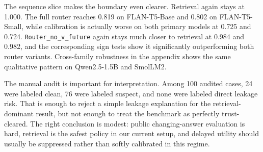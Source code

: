 The sequence slice makes the boundary even clearer. Retrieval again stays at 1.000. The full router reaches 0.819 on FLAN-T5-Base and 0.802 on FLAN-T5-Small, while calibration is actually worse on both primary models at 0.725 and 0.724. \texttt{Router\_no\_v\_future} again stays much closer to retrieval at 0.984 and 0.982, and the corresponding sign tests show it significantly outperforming both router variants. Cross-family robustness in the appendix shows the same qualitative pattern on Qwen2.5-1.5B and SmolLM2.

\begin{table}[h]
\centering
\small

\caption{Official FreshQA manual audit summary. The audit found no direct leakage-risk cases, but many cases remain suspect, so the public trust story is bounded rather than fully cleared.}
\label{tab:freshqa-audit}
\end{table}

The manual audit is important for interpretation. Among 100 audited cases, 24 were labeled clean, 76 were labeled suspect, and none were labeled direct leakage risk. That is enough to reject a simple leakage explanation for the retrieval-dominant result, but not enough to treat the benchmark as perfectly trust-cleared. The right conclusion is modest: public changing-answer evaluation is hard, retrieval is the safest policy in our current setup, and delayed utility should usually be suppressed rather than softly calibrated in this regime.
